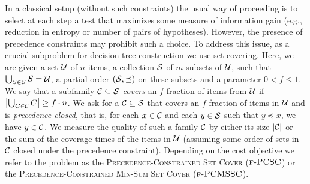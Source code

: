 % 
% 

In a classical setup (without such constraints) the usual way of proceeding is to select at each step a test that maximizes some measure of information gain (e.g., reduction in entropy or number of pairs of hypotheses). However, the presence of precedence constraints may prohibit such a choice.
To address this issue, as a crucial subproblem for decision tree construction we use set covering. Here, we are given a set $\mathcal{U}$ of $n$ items, a collection $\mathcal{S}$ of $m$ subsets of $\mathcal{U}$, such that $\bigcup_{S\in\mathcal{S}}S=\mathcal{U}$, a partial order $(\mathcal{S},\preceq)$ on these subsets and a parameter $0<f\leq 1$.
We say that a subfamily $\mathcal{C}\subseteq\mathcal{S}$ \emph{covers} an $f$-fraction of items from $\mathcal{U}$ if $\mathopen{}\left| \bigcup_{C\in\mathcal{C}}C \right|\geq f\cdot n$.
We ask for a $\mathcal{C}\subseteq\mathcal{S}$ that covers an $f$-fraction of items in $\mathcal{U}$ and is \emph{precedence-closed}, that is, for each $x\in\mathcal{C}$ and each $y\in\mathcal{S}$ such that $y\preceq x$, we have $y\in\mathcal{C}$. We measure the quality of such a family $\mathcal{C}$ by either its size $\mathopen{}\left| \mathcal{C} \right|$ or the sum of the coverage times of the items in $\mathcal{U}$ (assuming some order of sets in $\mathcal{C}$ closed under the precedence constraint). Depending on the cost objective we refer to the problem as the \textup{\textsc{Precedence-Constrained Set Cover}} ($\textup{\textsc{f-PCSC}}$) or the \textup{\textsc{Precedence-Constrained Min-Sum Set Cover}} ($\textup{\textsc{f-PCMSSC}}$).


